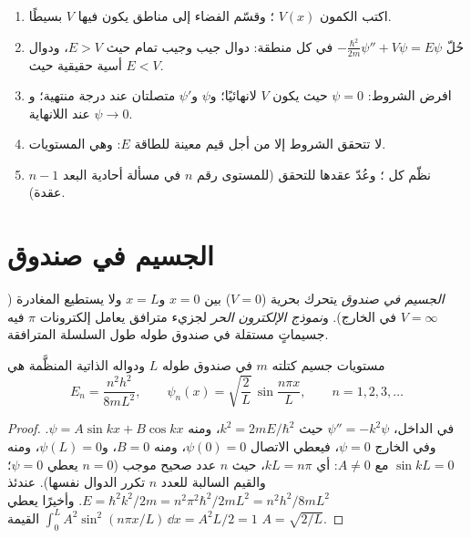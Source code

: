 \begin{method}\label{met:b3:quantum-model-systems:one-dimensional}
\begin{enumerate}
  \item اكتب الكمون $V(x)$ ؛ وقسّم الفضاء إلى
        مناطق يكون فيها $V$ بسيطًا.
  \item حُلّ $-\frac{\hbar^2}{2m}\psi'' + V\psi = E\psi$ في كل منطقة: دوال جيب
        وجيب تمام حيث $E > V$، ودوال أسية حقيقية حيث $E < V$.
  \item افرض الشروط: $\psi = 0$ حيث يكون $V$ لانهائيًا؛ و$\psi$
        و$\psi'$ متصلتان عند درجة منتهية؛ و$\psi \to 0$ عند اللانهاية.
  \item لا تتحقق الشروط إلا من أجل قيم معينة للطاقة $E$: وهي المستويات.
  \item نظّم كل ؛ وعُدّ عقدها للتحقق (للمستوى
        رقم $n$ في مسألة أحادية البعد $n - 1$ عقدة).
\end{enumerate}
\end{method}

\section{الجسيم في صندوق}

\begin{definition}\label{def:b3:quantum-model-systems:box}
\emph{الجسيم في صندوق} يتحرك بحرية ($V = 0$)
بين $x = 0$ و$x = L$ ولا يستطيع المغادرة ($V = \infty$ في الخارج). 
و\emph{نموذج الإلكترون الحر} لجزيء
مترافق يعامل إلكترونات $\pi$ فيه جسيماتٍ مستقلة في صندوق
طوله طول السلسلة المترافقة.
\end{definition}

\begin{theorem}\label{thm:b3:quantum-model-systems:box}
مستويات جسيم كتلته $m$ في صندوق طوله $L$ ودواله الذاتية المنظَّمة
هي
\[
E_n = \frac{n^2h^2}{8mL^2}, \qquad \psi_n(x) = \sqrt{\frac2L}\,\sin\frac{n\pi
x}{L}, \qquad n = 1, 2, 3, \dots
\]
\end{theorem}

\begin{proof}
في الداخل، $\psi'' = -k^2\psi$ حيث $k^2 = 2mE/\hbar^2$، ومنه $\psi = A\sin kx +
B\cos kx$. وفي الخارج $\psi = 0$، فيعطي الاتصال $\psi(0) = 0$، ومنه $B =
0$، و$\psi(L) = 0$، ومنه $\sin kL = 0$ مع $A \ne 0$: أي $kL = n\pi$، حيث $n$
عدد صحيح موجب ($n = 0$ يعطي $\psi = 0$؛ والقيم السالبة للعدد $n$ تكرر الدوال
نفسها). عندئذ $E = \hbar^2k^2/2m = n^2\pi^2\hbar^2/2mL^2 = n^2h^2/8mL^2$.
وأخيرًا يعطي $\int_0^L A^2\sin^2(n\pi x/L)\,\dd x = A^2L/2 = 1$ القيمة $A =
\sqrt{2/L}$.
\end{proof}

